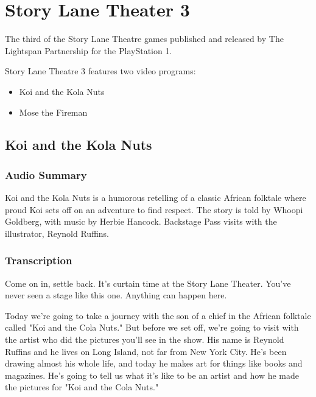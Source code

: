 \chapter{Story Lane Theater 3}


The third of the Story Lane Theatre games published and released by The Lightspan Partnership for the PlayStation 1.

Story Lane Theatre 3 features two video programs:

\begin{itemize}
    \item Koi and the Kola Nuts
    \item Mose the Fireman
\end{itemize}

\clearpage
\newpage

\section{Koi and the Kola Nuts}

\subsection{Audio Summary}

Koi and the Kola Nuts is a humorous retelling of a classic African folktale where proud Koi sets off on an adventure to find respect. The story is told by Whoopi Goldberg, with music by Herbie Hancock. Backstage Pass visits with the illustrator, Reynold Ruffins.

\subsection{Transcription}

Come on in, settle back. It's curtain time at the Story Lane Theater. You've never seen a stage like this one. Anything can happen here.

Today we're going to take a journey with the son of a chief in the African folktale called "Koi and the Cola Nuts." But before we set off, we're going to visit with the artist who did the pictures you'll see in the show. His name is Reynold Ruffins and he lives on Long Island, not far from New York City. He's been drawing almost his whole life, and today he makes art for things like books and magazines. He's going to tell us what it's like to be an artist and how he made the pictures for "Koi and the Cola Nuts."


